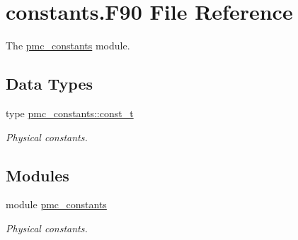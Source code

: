 \hypertarget{constants_8_f90}{}\section{constants.\+F90 File Reference}
\label{constants_8_f90}


The \mbox{\hyperlink{namespacepmc__constants}{pmc\+\_\+constants}} module.  


\subsection*{Data Types}
\begin{DoxyCompactItemize}
\item 
type \mbox{\hyperlink{structpmc__constants_1_1const__t}{pmc\+\_\+constants\+::const\+\_\+t}}
\begin{DoxyCompactList}\small\item\em Physical constants. \end{DoxyCompactList}\end{DoxyCompactItemize}
\subsection*{Modules}
\begin{DoxyCompactItemize}
\item 
module \mbox{\hyperlink{namespacepmc__constants}{pmc\+\_\+constants}}
\begin{DoxyCompactList}\small\item\em Physical constants. \end{DoxyCompactList}\end{DoxyCompactItemize}
